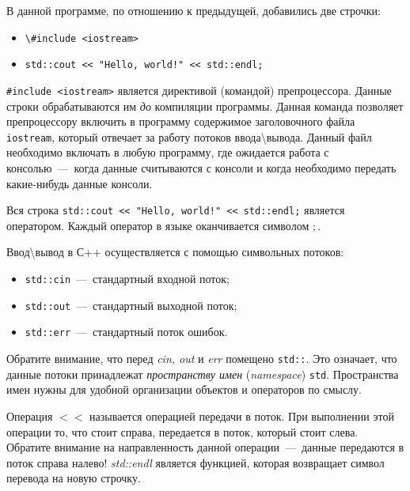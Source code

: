 В данной программе, по отношению к предыдущей, добавились две строчки:

\begin{itemize}
    \item \lstinline!\#include <iostream>!
    \item \lstinline|std::cout << "Hello, world!" << std::endl;|
\end{itemize}

\lstinline!#include <iostream>! является директивой (командой) препроцессора. Данные строки обрабатываются им \emph{до} компиляции программы. Данная команда позволяет препроцессору включить в программу содержимое заголовочного файла \lstinline!iostream!, который отвечает за работу потоков ввода\textbackslash вывода. Данный файл необходимо включать в любую программу, где ожидается работа с консолью~---~когда данные считываются с консоли и когда необходимо передать какие-нибудь данные консоли.

Вся строка \lstinline|std::cout << "Hello, world!" << std::endl;| является оператором. Каждый оператор в языке оканчивается символом $;$.

Ввод\textbackslash вывод в С++ осуществляется с помощью символьных потоков:
\begin{itemize}
    \item \lstinline!std::cin!~---~стандартный входной поток;
    \item \lstinline!std::out!~---~стандартный выходной поток;
    \item \lstinline!std::err!~---~стандартный поток ошибок.
\end{itemize}

Обратите внимание, что перед \textit{cin, out} и \textit{err} помещено \texttt{std::}. Это означает, что данные потоки принадлежат \textit{пространству имен} (\textit{namespace}) \texttt{std}. Пространства имен нужны для удобной организации объектов и операторов по смыслу.

Операция $<<$ называется $\textit{операцией передачи в поток}$. При выполнении этой операции то, что стоит справа, передается в поток, который стоит слева. Обратите внимание на направленность данной операции~---~данные передаются в поток справа налево! \textit{std::endl} является функцией, которая возвращает символ перевода на новую строчку.

